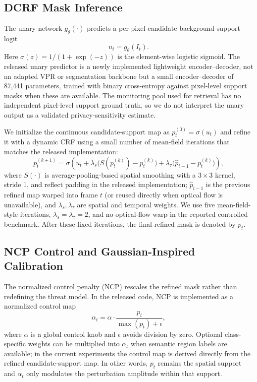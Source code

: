 \documentclass[10pt,journal]{IEEEtran}
\begin{document}
\subsection{DCRF Mask Inference}
The unary network $g_\theta(\cdot)$ predicts a per-pixel candidate background-support logit
\begin{equation}
\label{eq:unary}
u_t = g_\theta(I_t).
\end{equation}
Here $\sigma(z)=1/(1+\exp(-z))$ is the element-wise logistic sigmoid. The
released unary predictor is a newly implemented lightweight encoder--decoder,
not an adapted VPR or segmentation backbone but a small encoder--decoder of
87,441 parameters, trained with binary cross-entropy against pixel-level
support masks when these are available. The monitoring pool used for retrieval
has no independent pixel-level support ground truth, so we do not interpret
the unary output as a validated privacy-sensitivity estimate.

We initialize the continuous candidate-support map as $p_t^{(0)}=\sigma(u_t)$ and refine it with a dynamic CRF using a small number of mean-field iterations that matches the released implementation:
\begin{equation}
\label{eq:dcrf}
p_t^{(k+1)} =
\sigma\!\left(
u_t + \lambda_s \big(S(p_t^{(k)}) - p_t^{(k)}\big)
      + \lambda_\tau \big(\hat{p}_{t-1} - p_t^{(k)}\big)
\right),
\end{equation}
where $S(\cdot)$ is average-pooling-based spatial smoothing with a
$3\times3$ kernel, stride 1, and reflect padding in the released
implementation; $\hat{p}_{t-1}$ is the previous refined map warped into frame
$t$ (or reused directly when optical flow is unavailable), and $\lambda_s,
\lambda_\tau$ are spatial and temporal weights. We use five mean-field-style
iterations, $\lambda_s=\lambda_\tau=2$, and no optical-flow warp in the
reported controlled benchmark. After these fixed iterations, the final
refined mask is denoted by $p_t$.


\subsection{NCP Control and Gaussian-Inspired Calibration}
The normalized control penalty (NCP) rescales the refined mask rather than redefining the threat model. In the released code, NCP is implemented as a normalized control map
\begin{equation}
\label{eq:ncp}
\alpha_t = \alpha \cdot \frac{p_t}{\max(p_t)+\epsilon},
\end{equation}
where $\alpha$ is a global control knob and $\epsilon$ avoids division by zero. Optional class-specific weights can be multiplied into $\alpha_t$ when semantic region labels are available; in the current experiments the control map is derived directly from the refined candidate-support map. In other words, $p_t$ remains the spatial support and $\alpha_t$ only modulates the perturbation amplitude within that support.
\end{document}

